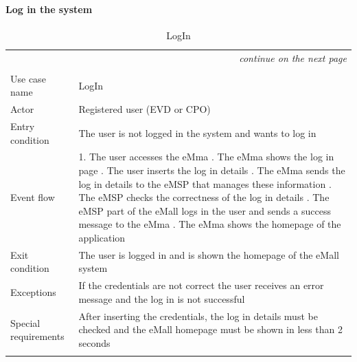 \paragraph{Log in the system}
\begin{center}
    \begin{longtable}{p{4cm} p{11cm}}
    \multicolumn{2}{r}{\itshape{continue on the next page}}\\
    \endfoot 
    \\
    \endlastfoot
    \hline
     Use case name &  LogIn\\
     \hline
     Actor & Registered user (EVD or CPO)\\
     \hline
     Entry condition &  The user is not logged in the system and wants to log in\\
     \hline
     Event flow &   1. The user accesses the eMma \newline
                    2. The eMma shows the log in page \newline
                    3. The user inserts the log in details \newline
                    4. The eMma sends the log in details to the eMSP that manages these information \newline
                    5. The eMSP checks the correctness of the log in details \newline
                    6. The eMSP part of the eMall logs in the user and sends a success message to the eMma \newline
                    7. The eMma shows the homepage of the application\\
     \hline
     Exit condition & The user is logged in and is shown the homepage of the eMall system \\
     \hline
     Exceptions &  If the credentials are not correct the user receives an error message and the log in is not successful \\
     \hline
     Special requirements &  After inserting the credentials, the log in details must be checked and the eMall homepage must be shown in less than 2 seconds \\
     \hline
    \caption{LogIn}
    \label{tab:LogIn}
    \end{longtable}
\end{center}


